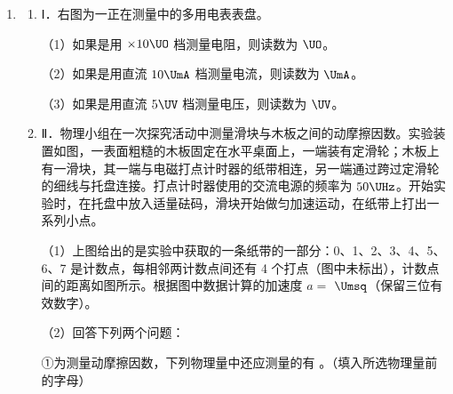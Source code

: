 \documentclass[\gkver]{gaokaozhenti}
\begin{document}
\begin{enumerate}

{加大 a、b 间的距离}
{取出 a、b 两极板间的电介质}
{换一块形状大小相同、介电常数更大的电介质}


\item
\begin{enumerate}
	\item
	Ⅰ．右图为一正在测量中的多用电表表盘。
	
	
	（1）如果是用 $\times10\UO$ 档测量电阻，则读数为 \tkanswer[1.5cm]{} $\UO$。
	
	（2）如果是用直流 $10\UmA$ 档测量电流，则读数为 \tkanswer[1.5cm]{} $\UmA$。
	
	（3）如果是用直流 $5\UV$ 档测量电压，则读数为 \tkanswer[1.5cm]{} $\UV$。
	
	\item
	Ⅱ．物理小组在一次探究活动中测量滑块与木板之间的动摩擦因数。实验装置如图，一表面粗糙的木板固定在水平桌面上，一端装有定滑轮；木板上有一滑块，其一端与电磁打点计时器的纸带相连，另一端通过跨过定滑轮的细线与托盘连接。打点计时器使用的交流电源的频率为 $50\UHz$。开始实验时，在托盘中放入适量砝码，滑块开始做匀加速运动，在纸带上打出一系列小点。
	
	
	（1）上图给出的是实验中获取的一条纸带的一部分：0、1、2、3、4、5、6、7 是计数点，每相邻两计数点间还有 4 个打点（图中未标出），计数点间的距离如图所示。根据图中数据计算的加速度 $a=$ \tkanswer[2.0cm]{} $\Umsq$（保留三位有效数字）。
	
	
	（2）回答下列两个问题：
	
	①为测量动摩擦因数，下列物理量中还应测量的有 \tkanswer[1.0cm]{}。（填入所选物理量前的字母）
	

\end{enumerate}
\end{enumerate}
\end{document}
